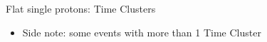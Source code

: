 \documentclass[10pt]{beamer}
\begin{document}
%
\begin{frame}{Flat single protons: Time Clusters}
\begin{itemize}
\item Side note: some events with more than 1 Time Cluster
\end{itemize}
\begin{center}
\end{center}
\end{frame}
\end{document}
